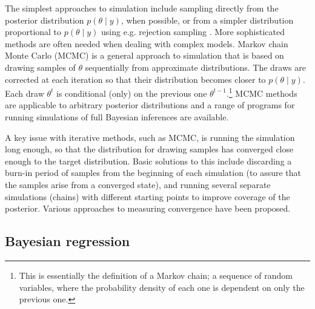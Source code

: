 
The simplest approaches to simulation include sampling directly from the
posterior distribution $p(\theta \mid y)$, when possible, or from a simpler distribution
proportional to $p(\theta \mid y)$ using e.g. rejection sampling \citep{Gelman2013}.
More sophisticated methods are often needed when dealing with complex models.
Markov chain Monte Carlo (MCMC) is a general approach to simulation
that is based on drawing samples of $\theta$ sequentially from approximate
distributions. The draws are corrected at each iteration so that their
distribution becomes closer to $p(\theta \mid y)$.
Each draw $\theta^t$ is conditional (only) on the previous one
$\theta^{t-1}$.\footnote{This is essentially the definition of a Markov chain;
a sequence of random variables, where the probability density of each one is
dependent on only the previous one.}
MCMC methods are applicable to arbitrary posterior distributions and a range
of programs for running simulations of full Bayesian inferences are available.

A key issue with iterative methods, such as MCMC, is running the simulation
long enough, so that the distribution for drawing samples has converged 
close enough to the target distribution. Basic solutions to this include discarding a
burn-in period of samples from the beginning of each simulation (to assure
that the samples arise from a converged state), and running several separate
simulations (chains) with different starting points to improve coverage of the
posterior. Various approaches to measuring convergence have been proposed.




\subsection{Bayesian regression}

